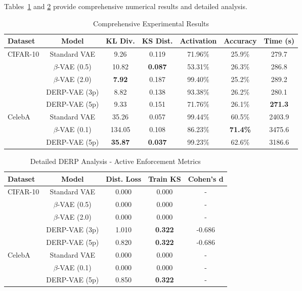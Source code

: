 \documentclass[11pt]{article}
\begin{document}
Tables~\ref{tab:comprehensive_results} and \ref{tab:detailed_analysis} provide comprehensive numerical results and detailed analysis.

\begin{table}[ht]
\centering
\caption{Comprehensive Experimental Results}
\label{tab:comprehensive_results}
\begin{tabular}{@{}lcccccc@{}}
\toprule
\textbf{Dataset} & \textbf{Model} & \textbf{KL Div.} & \textbf{KS Dist.} & \textbf{Activation} & \textbf{Accuracy} & \textbf{Time (s)} \\
\midrule
\multirow{5}{*}{CIFAR-10} & Standard VAE & 9.26 & 0.119 & 71.96\% & 25.9\% & 279.7 \\
& $\beta$-VAE (0.5) & 10.82 & \textbf{0.087} & 53.31\% & 26.3\% & 286.8 \\
& $\beta$-VAE (2.0) & \textbf{7.92} & 0.187 & 99.40\% & 25.2\% & 289.2 \\
& DERP-VAE (3p) & 8.82 & 0.138 & 93.38\% & 26.2\% & 280.1 \\
& DERP-VAE (5p) & 9.33 & 0.151 & 71.76\% & 26.1\% & \textbf{271.3} \\
\midrule
\multirow{3}{*}{CelebA} & Standard VAE & 35.26 & 0.057 & 99.44\% & 60.5\% & 2403.9 \\
& $\beta$-VAE (0.1) & 134.05 & 0.108 & 86.23\% & \textbf{71.4\%} & 3475.6 \\
& DERP-VAE (5p) & \textbf{35.87} & \textbf{0.037} & 99.23\% & 62.6\% & 3186.6 \\
\bottomrule
\end{tabular}
\end{table}

\begin{table}[ht]
\centering
\caption{Detailed DERP Analysis - Active Enforcement Metrics}
\label{tab:detailed_analysis}
\begin{tabular}{@{}lcccc@{}}
\toprule
\textbf{Dataset} & \textbf{Model} & \textbf{Dist. Loss} & \textbf{Train KS} & \textbf{Cohen's d} \\
\midrule
\multirow{5}{*}{CIFAR-10} & Standard VAE & 0.000 & 0.000 & - \\
& $\beta$-VAE (0.5) & 0.000 & 0.000 & - \\
& $\beta$-VAE (2.0) & 0.000 & 0.000 & - \\
& DERP-VAE (3p) & 1.010 & \textbf{0.322} & -0.686 \\
& DERP-VAE (5p) & 0.820 & \textbf{0.322} & -0.686 \\
\midrule
\multirow{3}{*}{CelebA} & Standard VAE & 0.000 & 0.000 & - \\
& $\beta$-VAE (0.1) & 0.000 & 0.000 & - \\
& DERP-VAE (5p) & 0.850 & \textbf{0.322} & - \\
\bottomrule
\end{tabular}
\end{table}
\end{document}
